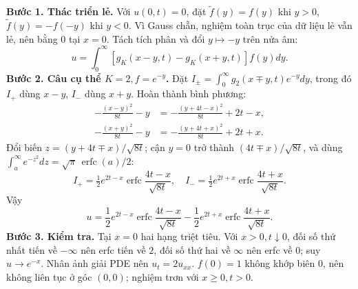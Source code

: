 \textbf{Bước 1. Thác triển lẻ.}
Với $u(0,t)=0$, đặt $\widetilde f(y)=f(y)$ khi $y>0$, $\widetilde f(y)=-f(-y)$ khi $y<0$. Vì Gauss chẵn, nghiệm toàn trục của dữ liệu lẻ vẫn lẻ, nên bằng $0$ tại $x=0$. Tách tích phân và đổi $y\mapsto-y$ trên nửa âm:
\[u=\int_0^\infty[g_K(x-y,t)-g_K(x+y,t)]f(y)dy.\]
\textbf{Bước 2. Câu cụ thể $K=2,f=e^{-y}$.}
Đặt $I_\pm=\int_0^\infty g_2(x\mp y,t)e^{-y}dy$, trong đó $I_+$ dùng $x-y$, $I_-$ dùng $x+y$. Hoàn thành bình phương:
\begin{align*}
-\frac{(x-y)^2}{8t}-y&=-\frac{(y+4t-x)^2}{8t}+2t-x,\\
-\frac{(x+y)^2}{8t}-y&=-\frac{(y+4t+x)^2}{8t}+2t+x.
\end{align*}
Đổi biến $z=(y+4t\mp x)/\sqrt{8t}$; cận $y=0$ trở thành $(4t\mp x)/\sqrt{8t}$, và dùng $\int_a^\infty e^{-z^2}dz=\sqrt\pi\,\operatorname{erfc}(a)/2$:
\[I_+=\tfrac12e^{2t-x}\operatorname{erfc}\frac{4t-x}{\sqrt{8t}},\quad
I_-=\tfrac12e^{2t+x}\operatorname{erfc}\frac{4t+x}{\sqrt{8t}}.\]
Vậy
\[u=\frac12e^{2t-x}\operatorname{erfc}\frac{4t-x}{\sqrt{8t}}
-\frac12e^{2t+x}\operatorname{erfc}\frac{4t+x}{\sqrt{8t}}.\]
\textbf{Bước 3. Kiểm tra.} Tại $x=0$ hai hạng triệt tiêu. Với $x>0,t\downarrow0$, đối số thứ nhất tiến về $-\infty$ nên erfc tiến về $2$, đối số thứ hai về $\infty$ nên erfc về $0$; suy $u\to e^{-x}$. Nhân ảnh giải PDE nên $u_t=2u_{xx}$. $f(0)=1$ không khớp biên $0$, nên không liên tục ở góc $(0,0)$; nghiệm trơn với $x\ge0,t>0$.

